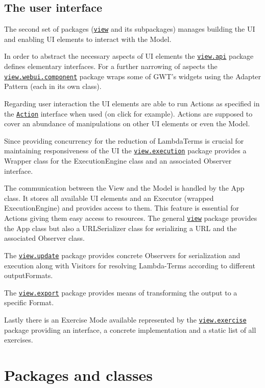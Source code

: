 \documentclass[a4paper, parskip=half]{scrartcl}
\newcommand{\pkglnk}[1]{\hyperref[pkg:edu.kit.wavelength.client.#1]{#1}}
\begin{document}
\subsection{The user interface}

The second set of packages (\texttt{\pkglnk{view}} and its subpackages) manages building the UI 
and enabling UI elements to interact with the Model.

In order to abstract the necessary aspects of UI elements the \texttt{\pkglnk{view.api}} package 
defines elementary interfaces.
For a further narrowing of aspects the \texttt{\pkglnk{view.webui.component}} package wraps some of 
GWT's widgets using the Adapter Pattern (each in its own class).

Regarding user interaction the UI elements are able to run Actions as specified in the 
\texttt{\hyperref[type:edu.kit.wavelength.client.view.action.Action]{Action}} interface when used (on click for example).
Actions are supposed to cover an abundance of manipulations on other UI elements or even the Model.

Since providing concurrency for the reduction of LambdaTerms is crucial for maintaining responsiveness of the UI 
the \texttt{\pkglnk{view.execution}} package provides a Wrapper class for the ExecutionEngine class and an associated
Observer interface.

The communication between the View and the Model is handled by the App class. It stores all available UI elements and
an Executor (wrapped ExecutionEngine) and provides access to them. This feature is essential for Actions giving them
easy access to resources.
The general \texttt{\pkglnk{view}} package provides the App class but also a URLSerializer class for serializing a URL
and the associated Observer class.

The \texttt{\pkglnk{view.update}} package provides concrete Observers for serialization and execution along with
Visitors for resolving Lambda-Terms according to different outputFormats.

The \texttt{\pkglnk{view.export}} package provides means of transforming the output to a specific Format.

Lastly there is an Exercise Mode available represented by the \texttt{\pkglnk{view.exercise}} package providing
an interface, a concrete implementation and a static list of all exercises.

\section{Packages and classes}

\end{document}
